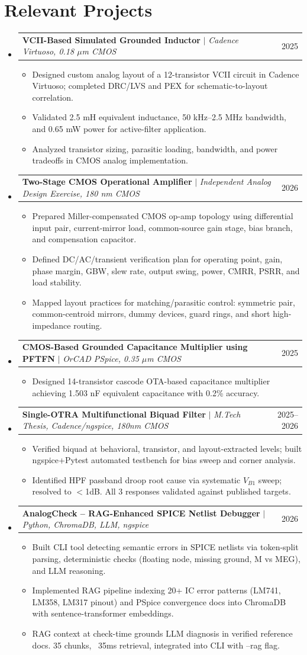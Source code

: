 \documentclass[letterpaper,10pt]{article}
\makeatletter
\newcommand{\resumeItem}[1]{\item\footnotesize{{#1 \vspace{-4pt}}}}
\newcommand{\resumeProjectHeading}[2]{
    \item
    \begin{tabular*}{0.97\textwidth}{l@{\extracolsep{\fill}}r}
      \footnotesize#1 & #2 \\
    \end{tabular*}\vspace{-4pt}
}
\newcommand{\resumeSubHeadingListStart}{\begin{itemize}[leftmargin=0.13in, label={}, itemsep=0pt]}
\newcommand{\resumeSubHeadingListEnd}{\end{itemize}}
\newcommand{\resumeItemListStart}{\begin{itemize}[leftmargin=0.17in, itemsep=2pt]}
\newcommand{\resumeItemListEnd}{\end{itemize}\vspace{-4pt}}
\makeatother
\begin{document}
\section{Relevant Projects}
    \resumeSubHeadingListStart
      \resumeProjectHeading{\textbf{VCII-Based Simulated Grounded Inductor} $|$ \emph{Cadence Virtuoso, 0.18 $\mu$m CMOS}}{2025}
          \resumeItemListStart
            \resumeItem{Designed custom analog layout of a 12-transistor VCII circuit in Cadence Virtuoso; completed DRC/LVS and PEX for schematic-to-layout correlation.}
            \resumeItem{Validated 2.5 mH equivalent inductance, 50 kHz--2.5 MHz bandwidth, and 0.65 mW power for active-filter application.}
            \resumeItem{Analyzed transistor sizing, parasitic loading, bandwidth, and power tradeoffs in CMOS analog implementation.}
          \resumeItemListEnd
      \resumeProjectHeading{\textbf{Two-Stage CMOS Operational Amplifier} $|$ \emph{Independent Analog Design Exercise, 180 nm CMOS}}{2026}
          \resumeItemListStart
            \resumeItem{Prepared Miller-compensated CMOS op-amp topology using differential input pair, current-mirror load, common-source gain stage, bias branch, and compensation capacitor.}
            \resumeItem{Defined DC/AC/transient verification plan for operating point, gain, phase margin, GBW, slew rate, output swing, power, CMRR, PSRR, and load stability.}
            \resumeItem{Mapped layout practices for matching/parasitic control: symmetric pair, common-centroid mirrors, dummy devices, guard rings, and short high-impedance routing.}
          \resumeItemListEnd
      \resumeProjectHeading{\textbf{CMOS-Based Grounded Capacitance Multiplier using PFTFN} $|$ \emph{OrCAD PSpice, 0.35 $\mu$m CMOS}}{2025}
          \resumeItemListStart
            \resumeItem{Designed 14-transistor cascode OTA-based capacitance multiplier achieving 1.503 nF equivalent capacitance with 0.2\% accuracy.}
          \resumeItemListEnd
      \resumeProjectHeading{\textbf{Single-OTRA Multifunctional Biquad Filter} $|$ \emph{M.Tech Thesis, Cadence/ngspice, 180nm CMOS}}{2025--2026}
          \resumeItemListStart
            \resumeItem{Verified biquad at behavioral, transistor, and layout-extracted levels; built ngspice+Pytest automated testbench for bias sweep and corner analysis.}
            \resumeItem{Identified HPF passband droop root cause via systematic $V_{B1}$ sweep; resolved to $<$1dB. All 3 responses validated against published targets.}
          \resumeItemListEnd
      \resumeProjectHeading{\textbf{AnalogCheck -- RAG-Enhanced SPICE Netlist Debugger} $|$ \emph{Python, ChromaDB, LLM, ngspice}}{2026}
          \resumeItemListStart
            \resumeItem{Built CLI tool detecting semantic errors in SPICE netlists via token-split parsing, deterministic checks (floating node, missing ground, M vs MEG), and LLM reasoning.}
            \resumeItem{Implemented RAG pipeline indexing 20+ IC error patterns (LM741, LM358, LM317 pinout) and PSpice convergence docs into ChromaDB with sentence-transformer embeddings.}
            \resumeItem{RAG context at check-time grounds LLM diagnosis in verified reference docs. 35 chunks, ~35ms retrieval, integrated into CLI with --rag flag.}
          \resumeItemListEnd
    \resumeSubHeadingListEnd
\end{document}

